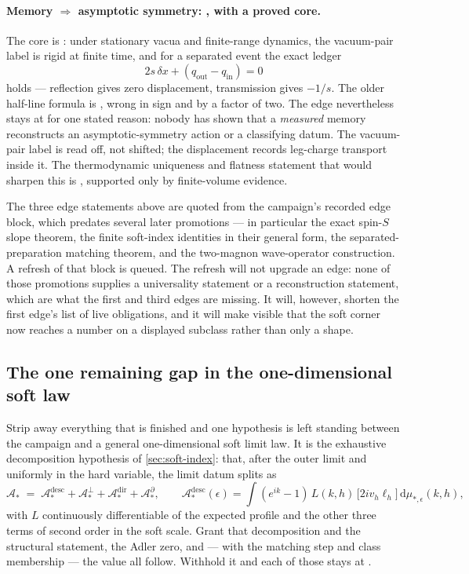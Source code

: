 \paragraph{Memory $\Rightarrow$ asymptotic symmetry: \statusSketch, with a
proved core.}
The core is \statusProved{}: under stationary vacua and finite-range dynamics,
the vacuum-pair label is rigid at finite time, and for a separated event the
exact ledger
\[
  2s\,\delta x+(q_{\mathrm{out}}-q_{\mathrm{in}})=0
\]
holds --- reflection gives zero displacement, transmission gives $-1/s$. The
older half-line formula is \statusRefuted{}, wrong in sign and by a factor of
two. The edge nevertheless stays at \statusSketch{} for one stated reason:
nobody has shown that a \emph{measured} memory reconstructs an
asymptotic-symmetry action or a classifying datum. The vacuum-pair label is
read off, not shifted; the displacement records leg-charge transport inside
it. The thermodynamic uniqueness and flatness statement that would sharpen
this is \statusConjecture{}, supported only by finite-volume evidence.

\begin{remark}
The three edge statements above are quoted from the campaign's recorded edge
block, which predates several later promotions --- in particular the exact
spin-$S$ slope theorem, the finite soft-index identities in their general
form, the separated-preparation matching theorem, and the two-magnon
wave-operator construction. A refresh of that block is queued. The refresh
will not upgrade an edge: none of those promotions supplies a universality
statement or a reconstruction statement, which are what the first and third
edges are missing. It will, however, shorten the first edge's list of live
obligations, and it will make visible that the soft corner now reaches a
number on a displayed subclass rather than only a shape.
\end{remark}

\subsection{The one remaining gap in the one-dimensional soft law}

Strip away everything that is finished and one hypothesis is left standing
between the campaign and a general one-dimensional soft limit law. It is the
exhaustive decomposition hypothesis of \cref{sec:soft-index}: that, after the
outer limit and uniformly in the hard variable, the limit datum splits as
\[
  \mathcal{A}_* \;=\; \mathcal{A}_*^{\mathrm{desc}}
                    +\mathcal{A}_*^{\perp}
                    +\mathcal{A}_*^{\mathrm{dir}}
                    +\mathcal{A}_*^{\partial},
  \qquad
  \mathcal{A}_*^{\mathrm{desc}}(\epsilon)
   =\int (e^{ik}-1)\,L(k,h)\,\bigl[2iv_h\ell_h\bigr]\,
     \mathrm{d}\mu_{*,\epsilon}(k,h),
\]
with $L$ continuously differentiable of the expected profile and the other
three terms of second order in the soft scale. Grant that decomposition and
the structural statement, the Adler zero, and --- with the matching step and
class membership --- the value all follow. Withhold it and each of those stays
at \statusSketch{}.

